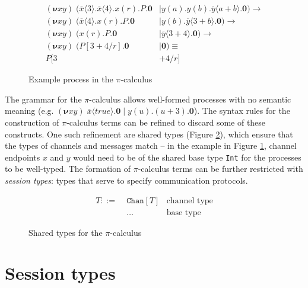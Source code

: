 \documentclass{mproj}
\newcommand{\PO}{\mathbf{0}}
\newcommand{\comp}[2]{#1 \mid #2}
\newcommand{\new}[2]{(\boldsymbol{\nu} #1 #2) \;}
\newcommand{\cout}[2]{\overline{#1}\langle#2\rangle.}
\newcommand{\cin}[2]{#1(#2).}
\newcommand{\subst}[3]{#1[#2/#3]}
\newcommand{\picalc}{$\pi$-calculus}
\newcommand{\type}{\texttt}
\newcommand{\reduce}{\rightarrow}
\begin{document}
\begin{figure}[H]
    \begin{align*}
    \new{x}{y} (\comp{\cout{x}{3} \cout{x}{4} \cin{x}{r} P. \PO &}
                     {\cin{y}{a} \cin{y}{b} \cout{y}{a+b} \PO})
    \reduce
    \\
    \new{x}{y} (\comp{\cout{x}{4} \cin{x}{r} P. \PO &}
                     {\cin{y}{b} \cout{y}{3+b} \PO})
    \reduce
    \\
    \new{x}{y} (\comp{\cin{x}{r} P. \PO &}
                     {\cout{y}{3+4} \PO})
    \reduce
    \\
    \new{x}{y} (\comp{\subst{P}{3+4}{r}. \PO &}
                     {\PO})
    \equiv
    \\
    \subst{P}{3&+4}{r}
    \end{align*}
    \caption{Example process in the \picalc{}}
    \label{picalc-example}
\end{figure}

The grammar for the \picalc{} allows well-formed processes with no semantic meaning (e.g. $\new{x}{y} \comp {\cout{x}{true}\PO} {\cin{y}{u}(u+3).\PO}$). The syntax rules for the construction of \picalc{} terms can be refined to discard some of these constructs. One such refinement are shared types (Figure \ref{picalc-shared-types}), which ensure that the types of channels and messages match -- in the example in Figure \ref{picalc-example}, channel endpoints $x$ and $y$ would need to be of the shared base type \type{Int} for the processes to be well-typed. The formation of \picalc{} terms can be further restricted with \emph{session types}: types that serve to specify communication protocols.

\begin{figure}[H]
    \begin{align*}
    T ::= \; &\type{Chan}[T] & \text{channel type} \\
             &\ldots         & \text{base type}
    \end{align*}
    \caption{Shared types for the \picalc{}}
    \label{picalc-shared-types}
\end{figure}

\section{Session types}\label{session-types}

\end{document}
